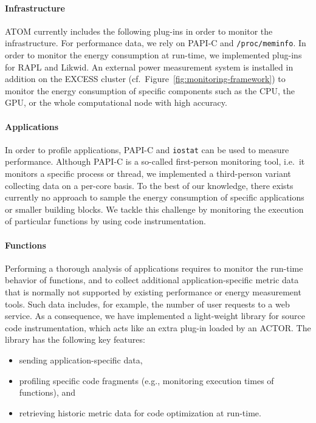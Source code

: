 \documentclass[10pt,letterpaper]{IEEEtran}
\begin{document}
\paragraph{Infrastructure}
ATOM currently includes the following plug-ins in order to monitor the infrastructure. For performance data,
we rely on PAPI-C and \texttt{/proc/meminfo}. In order to monitor the energy consumption at run-time, we
implemented plug-ins for RAPL and Likwid. An external power measurement system is installed in addition
on the EXCESS cluster (cf.~Figure~\ref{fig:monitoring-framework}) to monitor the energy consumption of
specific components such as the CPU, the GPU, or the whole computational node with high accuracy.

\paragraph{Applications}
In order to profile applications, PAPI-C and \texttt{iostat} can be used to measure performance. Although
PAPI-C is a so-called first-person monitoring tool, i.e.\ it monitors a specific process or thread, we
implemented a third-person variant collecting data on a per-core basis. To the best of our knowledge,
there exists currently no approach to sample the energy consumption of specific applications or smaller
building blocks. We tackle this challenge by monitoring the execution of particular functions by using code instrumentation.

\paragraph{Functions}
Performing a thorough analysis of applications requires to monitor the run-time behavior of functions,
and to collect additional application-specific metric data that is normally not supported by existing
performance or energy measurement tools. Such data includes, for example, the number of user requests
to a web service. As a consequence, we have implemented a light-weight library for source code instrumentation,
which acts like an extra plug-in loaded by an ACTOR. The library has the following key features:

\begin{itemize}
\itemsep1pt\parskip0pt
\item
sending application-specific data,

\item
profiling specific code fragments (e.g., monitoring execution times of functions), and

\item
retrieving historic metric data for code optimization at run-time.
\end{itemize}
\end{document}
